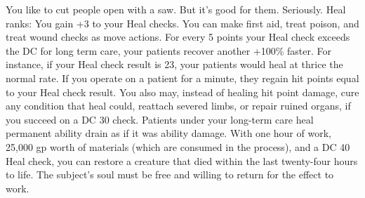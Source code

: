 \skillfeat
{You like to cut people open with a saw. But it's good for them. Seriously.}
{Heal ranks:}
{You gain +3 to your Heal checks.}
{You can make first aid, treat poison, and treat wound checks as move actions.}
{For every 5 points your Heal check exceeds the DC for long term care, your patients recover another +100\% faster. For instance, if your Heal check result is 23, your patients would heal at thrice the normal rate.}
{If you operate on a patient for a minute, they regain hit points equal to your Heal check result. You also may, instead of healing hit point damage, cure any condition that heal could, reattach severed limbs, or repair ruined organs, if you succeed on a DC 30 check. Patients under your long-term care heal permanent ability drain as if it was ability damage.}
{With one hour of work, 25,000 gp worth of materials (which are consumed in the process), and a DC 40 Heal check, you can restore a creature that died within the last twenty-four hours to life. The subject's soul must be free and willing to return for the effect to work.}